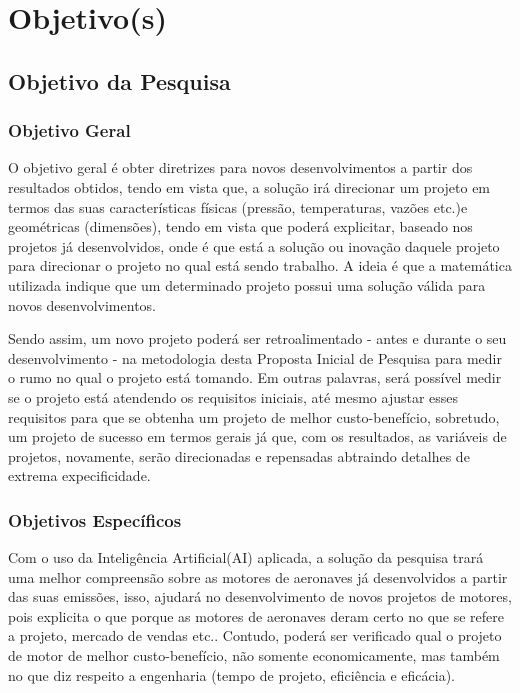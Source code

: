 \documentclass[12pt]{article} %
\begin{document}
	
	\newpage
	\chapter{Objetivo(s)}
	
		\pagestyle{fancy}
		\thispagestyle{empty}
		\section{Objetivo da Pesquisa}
		
			\subsection{Objetivo Geral}
			
				O objetivo geral é obter diretrizes para novos desenvolvimentos a partir dos resultados obtidos, tendo em vista que, a solução irá direcionar um projeto em termos das suas características físicas (pressão, temperaturas, vazões etc.)e geométricas (dimensões), tendo em vista que poderá explicitar, baseado nos projetos já desenvolvidos, onde é que está a solução ou inovação daquele projeto para direcionar o projeto no qual está sendo trabalho. A ideia é que a matemática utilizada indique que um determinado projeto possui uma solução válida para novos desenvolvimentos.
				
				Sendo assim, um novo projeto poderá ser retroalimentado - antes e durante o seu desenvolvimento - na metodologia desta Proposta Inicial de Pesquisa para medir o rumo no qual o projeto está tomando. Em outras palavras, será possível medir se o projeto está atendendo os requisitos iniciais, até mesmo ajustar esses requisitos para que se obtenha um projeto de melhor custo-benefício, sobretudo, um projeto de sucesso em termos gerais já que, com os resultados, as variáveis de projetos, novamente, serão direcionadas e repensadas abtraindo detalhes de extrema expecificidade.
			
			\subsection{Objetivos Específicos}
			
				Com o uso da Inteligência Artificial(AI) \cite{Russell2002} aplicada, a solução da pesquisa trará uma melhor compreensão sobre as motores de aeronaves já desenvolvidos a partir das suas emissões, isso, ajudará no desenvolvimento de novos projetos de motores, pois explicita o que porque as motores de aeronaves deram certo no que se refere a projeto, mercado de vendas etc.. Contudo, poderá ser verificado qual o projeto de motor de melhor custo-benefício, não somente economicamente, mas também no que diz respeito a engenharia (tempo de projeto, eficiência e eficácia).	
		
\end{document}
